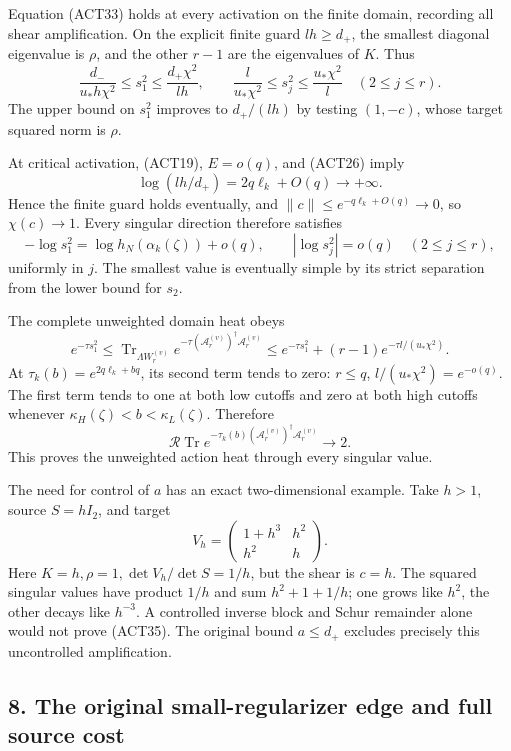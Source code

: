 \documentclass[11pt]{article}
\begin{document}
Equation (ACT33) holds at every activation on the finite domain, recording all shear amplification. On the explicit finite guard \(lh\ge d_+\), the smallest diagonal eigenvalue is \(\rho\), and the other \(r-1\) are the eigenvalues of \(K\). Thus \[
\boxed{\frac{d_-}{u_*h\chi^2}\le s_1^2\le\frac{d_+\chi^2}{lh},\qquad
\frac{l}{u_*\chi^2}\le s_j^2\le\frac{u_*\chi^2}{l}\quad(2\le j\le r).}
\tag{ACT34}
\] The upper bound on \(s_1^2\) improves to \(d_+/(lh)\) by testing \((1,-c)\), whose target squared norm is \(\rho\).

At critical activation, (ACT19), \(E=o(q)\), and (ACT26) imply \[
\log(lh/d_+)=2q\ell_k+O(q)\to+\infty.
\] Hence the finite guard holds eventually, and \(\|c\|\le e^{-q\ell_k+O(q)}\to0\), so \(\chi(c)\to1\). Every singular direction therefore satisfies \[
-\log s_1^2=\log h_N(\alpha_k(\zeta))+o(q),\qquad
|\log s_j^2|=o(q)\quad(2\le j\le r),
\tag{ACT35}
\] uniformly in \(j\). The smallest value is eventually simple by its strict separation from the lower bound for \(s_2\).

The complete unweighted domain heat obeys \[
e^{-\tau s_1^2}\le
\operatorname{Tr}_{\Lambda W_r^{(v)}}e^{-\tau(\mathscr A_r^{(v)})^\dagger
 \mathscr A_r^{(v)}}
\le e^{-\tau s_1^2}+(r-1)e^{-\tau l/(u_*\chi^2)}.
\tag{ACT36}
\] At \(\tau_k(b)=e^{2q\ell_k+bq}\), its second term tends to zero: \(r\le q\), \(l/(u_*\chi^2)=e^{-o(q)}\). The first term tends to one at both low cutoffs and zero at both high cutoffs whenever \(\kappa_H(\zeta)<b<\kappa_L(\zeta)\). Therefore \[
\boxed{\mathcal R\operatorname{Tr}
e^{-\tau_k(b)(\mathscr A_r^{(v)})^\dagger\mathscr A_r^{(v)}}\to2.}
\tag{ACT37}
\] This proves the unweighted action heat through every singular value.

The need for control of \(a\) has an exact two-dimensional example. Take \(h>1\), source \(S=hI_2\), and target \[
V_h=\begin{pmatrix}1+h^3&h^2\\h^2&h\end{pmatrix}.
\] Here \(K=h,\rho=1,\det V_h/\det S=1/h\), but the shear is \(c=h\). The squared singular values have product \(1/h\) and sum \(h^2+1+1/h\); one grows like \(h^2\), the other decays like \(h^{-3}\). A controlled inverse block and Schur remainder alone would not prove (ACT35). The original bound \(a\le d_+\) excludes precisely this uncontrolled amplification.

\subsection{8. The original small-regularizer edge and full source cost}\label{the-original-small-regularizer-edge-and-full-source-cost}
\end{document}
